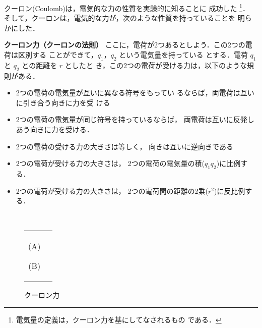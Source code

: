         クーロン(Coulomb)は，電気的な力の性質を実験的に知ることに
        成功した
            \footnote{
                電気量の定義は，クーロン力を基にしてなされるもの
                である．
            }．
        そして，クーロンは，電気的な力が，次のような性質を持っていることを
        明らかにした．
        \\
        \begin{itembox}[l]{\textbf{クーロン力（クーロンの法則）}}
            ここに，電荷が2つあるとしよう．この2つの電荷は区別する
            ことができて，$q_{1}$，$q_{2}$ という電気量を持っている
            とする．電荷 $q_{1}$ と $q_{2}$ との距離を $r$ としたと
            き，この2つの電荷が受ける力は，以下のような規則がある．
            \begin{itemize}
                \item 2つの電荷の電気量が互いに異なる符号をもってい
                      るならば，両電荷は互いに引き合う向きに力を受
                      ける
                \item 2つの電荷の電気量が同じ符号を持っているならば，
                      両電荷は互いに反発しあう向きに力を受ける．
                \item 2つの電荷の受ける力の大きさは等しく，
                      向きは互いに逆向きである
                \item 2つの電荷が受ける力の大きさは，
                      2つの電荷の電気量の積($q_{1}q_{2}$)に比例する．
                \item 2つの電荷が受ける力の大きさは，
                      2つの電荷間の距離の2乗($r^{2}$)に反比例する．
            \end{itemize}
        \end{itembox}
        \\
        \begin{figure}[hbt]
            \begin{tabular}{cc}
                \begin{minipage}{0.5\hsize}
                    \begin{center}
                        {coulombs_low1.pdf}

                        (A)
                    \end{center}
                \end{minipage}
                \begin{minipage}{0.5\hsize}
                    \begin{center}
                        {coulombs_low2.pdf}

                        (B)
                    \end{center}
                \end{minipage}
            \end{tabular}
                        \caption{クーロン力}
                        \label{fig:coulombs_low}
        \end{figure}

